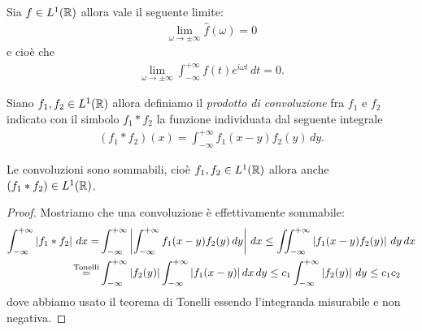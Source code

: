 \begin{theorem}
  Sia $ f \in L^1(\R) $ allora vale il seguente limite:
  \begin{align}
    \lim_{\omega \to \pm \infty} \hat{f}(\omega) = 0
  \end{align}
  e cioè che 
  \begin{align}
    \lim_{\omega \to \pm\infty} \int_{-\infty}^{+\infty} f(t ) e^{i \omega t} \, dt = 0.
  \end{align}
\end{theorem}

\begin{definition}[ Convoluzione ]
  Siano $ f_1, f_2 \in L^1(\R) $ allora definiamo il \textit{prodotto di convoluzione} fra $ f_1 $ e $ f_2 $ indicato con il simbolo $ f_1*f_2 $ 
  la funzione individuata dal seguente integrale 
  \begin{align}
    (f_1*f_2)(x) = \int_{-\infty}^{+\infty} f_1(x - y)f_2(y) \, dy.
  \end{align}
\end{definition}

\begin{lemma}[  ]
  Le convoluzioni sono sommabili, cioè $ f_1, f_2 \in L^1(\R) $ allora anche $ (f_1*f_2) \in L^1(\R) $.
\end{lemma}
\begin{proof}
  Mostriamo che una convoluzione è effettivamente sommabile:
  \begin{align}
    \int_{-\infty}^{+\infty} \abs{f_1*f_2} \,dx = &\int_{-\infty}^{+\infty} \abs{\int_{-\infty}^{+\infty} f_1(x - y)f_2(y) \, dy} \,dx 
    \leq \iint_{-\infty}^{+\infty}  \abs{f_1(x - y)f_2(y)} \, dy \,dx
    \\
    \ov{=}{\textnormal{Tonelli}} &\int_{-\infty}^{+\infty} \abs{f_2(y)} \int_{-\infty}^{+\infty} \abs{f_1(x - y)} dx \, dy 
    \leq c_1 \int_{-\infty}^{+\infty} \abs{f_2(y)} \,dy \leq c_1 c_2
  \end{align}
  dove abbiamo usato il teorema di Tonelli essendo l'integranda misurabile e non negativa. 
\end{proof}

